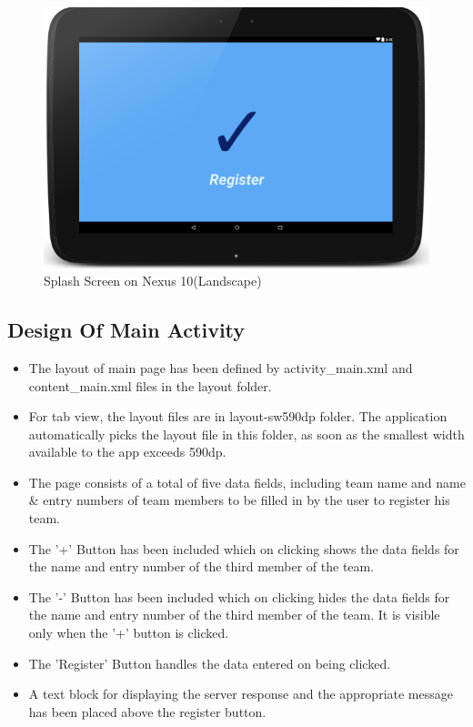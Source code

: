 \documentclass{article}
\begin{document}
\begin{figure}[!ht]
	\centering
  \includegraphics[scale=0.8]{./N10-Splash.png}
  \caption{ Splash Screen on Nexus 10(Landscape)}
\end{figure}

\subsection{Design Of Main Activity}
\begin{itemize}
\item The layout of main page has been defined by activity\_main.xml and content\_main.xml files in the layout folder. 
\item For tab view, the layout files are in layout-sw590dp folder. The application automatically picks the layout file in this folder, as soon as the smallest width available to the app exceeds 590dp.
\item The page consists of a total of five data fields, including team name and name \& entry numbers of team members to be filled in by the user to register his team.
\item The '+' Button has been included which on clicking shows the data fields for the name and entry number of the third member of the team.
\item The '-' Button has been included which on clicking hides the data fields for the name and entry number of the third member of the team. It is visible only when the '+' button is clicked.
\item The 'Register' Button handles the data entered on being clicked.
\item A text block for displaying the server response and the appropriate message has been placed above the register button.

\end{itemize} 
\end{document}
